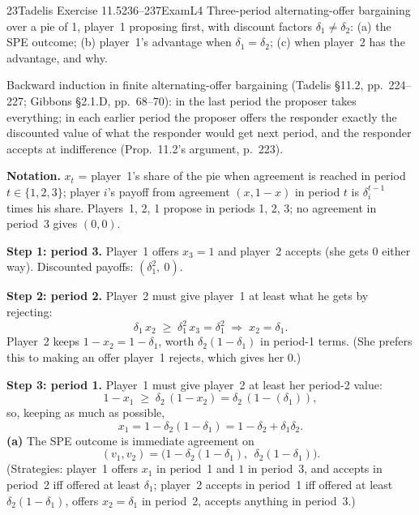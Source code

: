\begin{exsol}{23}{Tadelis Exercise 11.5}{236--237}{Exam}{L4}
\asked Three-period alternating-offer bargaining over a pie of 1, player~1 proposing first, with
discount factors $\delta_1 \ne \delta_2$: (a) the SPE outcome; (b) player~1's advantage when
$\delta_1 = \delta_2$; (c) when player~2 has the advantage, and why.

\method Backward induction in finite alternating-offer bargaining (Tadelis \S11.2, pp.~224--227;
Gibbons \S2.1.D, pp.~68--70): in the last period the proposer takes everything; in each earlier
period the proposer offers the responder exactly the discounted value of what the responder would
get next period, and the responder accepts at indifference (Prop.~11.2's argument, p.~223).

\solution
\textbf{Notation.} $x_t$ = player~1's share of the pie when agreement is reached in period
$t \in \{1,2,3\}$; player $i$'s payoff from agreement $(x, 1-x)$ in period $t$ is $\delta_i^{t-1}$
times his share. Players~1, 2, 1 propose in periods 1, 2, 3; no agreement in period~3 gives $(0,0)$.

\textbf{Step 1: period 3.} Player~1 offers $x_3 = 1$ and player~2 accepts (she gets 0 either way).
Discounted payoffs: $(\delta_1^2,\ 0)$.

\textbf{Step 2: period 2.} Player~2 must give player~1 at least what he gets by rejecting:
\begin{equation}
  \delta_1\, x_2 \;\ge\; \delta_1^2\, x_3 = \delta_1^2 \;\Rightarrow\; x_2 = \delta_1 . \label{eq:23x2}
\end{equation}
Player~2 keeps $1 - x_2 = 1 - \delta_1$, worth $\delta_2(1 - \delta_1)$ in period-1 terms. (She prefers
this to making an offer player~1 rejects, which gives her 0.)

\textbf{Step 3: period 1.} Player~1 must give player~2 at least her period-2 value:
\[
  1 - x_1 \;\ge\; \delta_2\,(1 - x_2) = \delta_2\,(1 - (\delta_1)) ,
\]
so, keeping as much as possible,
\begin{equation}
  x_1 = 1 - \delta_2(1 - \delta_1) = 1 - \delta_2 + \delta_1\delta_2 . \label{eq:23x1}
\end{equation}
\textbf{(a)} The SPE outcome is immediate agreement on
\[
  (v_1, v_2) = \bigl(1 - \delta_2(1 - \delta_1),\ \ \delta_2(1 - \delta_1)\bigr).
\]
(Strategies: player~1 offers $x_1$ in period~1 and $1$ in period~3, and accepts in period~2 iff
offered at least $\delta_1$; player~2 accepts in period~1 iff offered at least
$\delta_2(1-\delta_1)$, offers $x_2 = \delta_1$ in period~2, accepts anything in period~3.)


\end{exsol}
